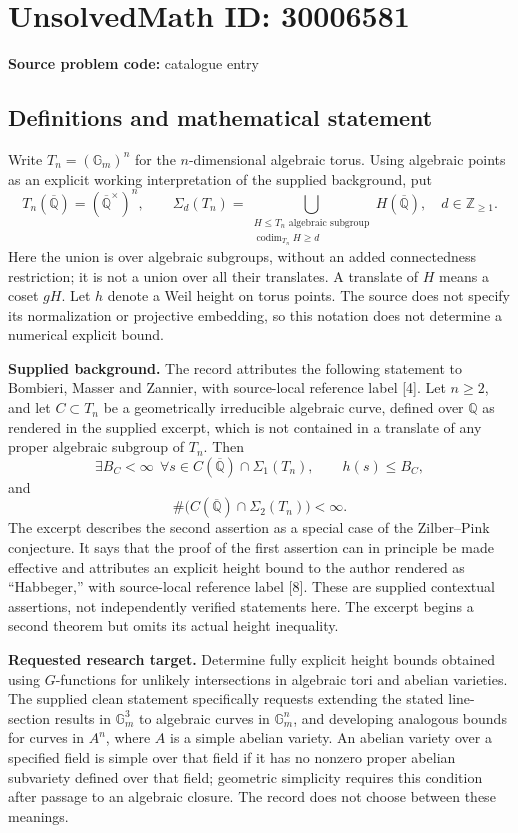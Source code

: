 \documentclass[11pt]{article}
\newcommand{\Z}{\mathbb{Z}}
\newcommand{\Q}{\mathbb{Q}}
\begin{document}
\section*{UnsolvedMath ID: 30006581}
\textbf{Source problem code:} catalogue entry
\subsection{Definitions and mathematical statement}
Write \(T_n=(\mathbb{G}_m)^n\) for the \(n\)-dimensional algebraic torus. Using algebraic points as an explicit working interpretation of the supplied background, put
\[
T_n(\overline{\Q})=(\overline{\Q}^{\times})^n,
\qquad
\Sigma_d(T_n)=\bigcup_{\substack{H\leq T_n\text{ algebraic subgroup}\\ \operatorname{codim}_{T_n}H\geq d}}H(\overline{\Q}),
\quad d\in\Z_{\geq1}.
\]
Here the union is over algebraic subgroups, without an added connectedness restriction; it is not a union over all their translates. A translate of \(H\) means a coset \(gH\). Let \(h\) denote a Weil height on torus points. The source does not specify its normalization or projective embedding, so this notation does not determine a numerical explicit bound.

\textbf{Supplied background.} The record attributes the following statement to Bombieri, Masser and Zannier, with source-local reference label [4]. Let \(n\geq2\), and let \(C\subset T_n\) be a geometrically irreducible algebraic curve, defined over \(\Q\) as rendered in the supplied excerpt, which is not contained in a translate of any proper algebraic subgroup of \(T_n\). Then
\[
\exists B_C<\infty\ \ \forall s\in C(\overline{\Q})\cap\Sigma_1(T_n),\qquad h(s)\leq B_C,
\]
and
\[
\#\bigl(C(\overline{\Q})\cap\Sigma_2(T_n)\bigr)<\infty.
\]
The excerpt describes the second assertion as a special case of the Zilber--Pink conjecture. It says that the proof of the first assertion can in principle be made effective and attributes an explicit height bound to the author rendered as ``Habbeger,'' with source-local reference label [8]. These are supplied contextual assertions, not independently verified statements here. The excerpt begins a second theorem but omits its actual height inequality.

\textbf{Requested research target.} Determine fully explicit height bounds obtained using \(G\)-functions for unlikely intersections in algebraic tori and abelian varieties. The supplied clean statement specifically requests extending the stated line-section results in \(\mathbb{G}_m^3\) to algebraic curves in \(\mathbb{G}_m^n\), and developing analogous bounds for curves in \(A^n\), where \(A\) is a simple abelian variety. An abelian variety over a specified field is simple over that field if it has no nonzero proper abelian subvariety defined over that field; geometric simplicity requires this condition after passage to an algebraic closure. The record does not choose between these meanings.
\end{document}
